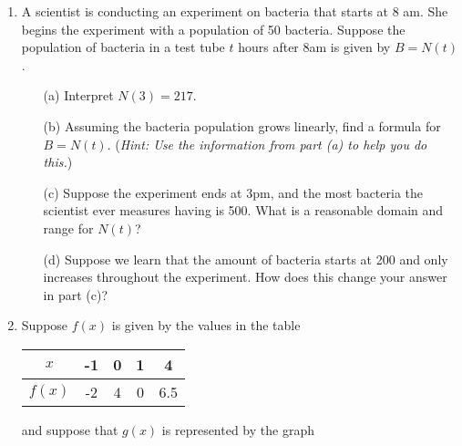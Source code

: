 \documentclass[12pt]{article}
\begin{document}
\begin{enumerate}
\begin{enumerate}
\vspace{.5in}


\item {}
\end{enumerate}

\vspace{.5in}

\newpage

\item A scientist is conducting an experiment on bacteria that starts at 8 am. She begins the experiment with a population of 50 bacteria. Suppose the population of bacteria in a test tube $t$ hours after 8am is given by $B=N(t)$. 
\begin{itemize}
\item[(a)] Interpret $N(3)=217$.
\vspace{1.5in}

\item[(b)] Assuming the bacteria population grows linearly, find a formula for $B=N(t)$. (\textit{Hint: Use the information from part (a) to help you do this.})
\vspace{1.5in}

\item[(c)] Suppose the experiment ends at 3pm, and the most bacteria the scientist ever measures having is 500. What is a reasonable domain and range for $N(t)$?
\vspace{1in}

\item[(d)] Suppose we learn that the amount of bacteria starts at 200 and only increases throughout the experiment. How does this change your answer in part (c)?
\vspace{.75in}
\end{itemize}

\newpage\item Suppose $f(x)$ is given by the values in the table

\begin{center}
\begin{table}[h!]
\centering
\renewcommand\arraystretch{1.2}
\begin{tabular}{|c||c|c|c|c|}
\hline
$x$ & -1 & 0 & 1 & 4 \\ \hline
$f(x)$ & -2 & 4 & 0 & 6.5 \\ \hline
\end{tabular}
\end{table}
\end{center}
\vspace{-0.45in}
and suppose that $g(x)$ is represented by the graph


\end{enumerate}
\end{document}
